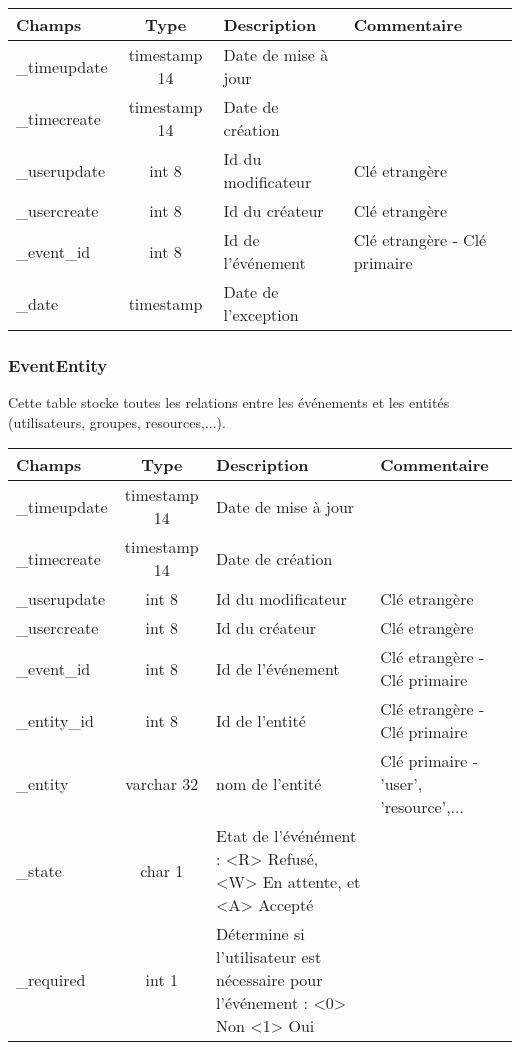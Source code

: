 \begin{tabular}{|p{3cm}|c|p{5.4cm}|p{2.6cm}|}
\hline
\textbf{Champs} & \textbf{Type} & \textbf{Description} & \textbf{Commentaire} \\
\hline
\_timeupdate & timestamp 14 & Date de mise à jour & \\
\hline
\_timecreate & timestamp 14 & Date de création & \\
\hline
\_userupdate & int 8 & Id du modificateur & Clé etrangère\\
\hline
\_usercreate & int 8 & Id du créateur & Clé etrangère\\
\hline
\_event\_id & int 8 & Id de l'événement & Clé etrangère - Clé primaire \\
\hline
\_date & timestamp & Date de l'exception & \\
\hline
\end{tabular}


\subsubsection{EventEntity}

Cette table stocke toutes les relations entre les événements et les entités (utilisateurs, groupes, resources,...).\\


\begin{tabular}{|p{3cm}|c|p{5.4cm}|p{2.6cm}|}
\hline
\textbf{Champs} & \textbf{Type} & \textbf{Description} & \textbf{Commentaire} \\
\hline
\_timeupdate & timestamp 14 & Date de mise à jour & \\
\hline
\_timecreate & timestamp 14 & Date de création & \\
\hline
\_userupdate & int 8 & Id du modificateur & Clé etrangère\\
\hline
\_usercreate & int 8 & Id du créateur & Clé etrangère\\
\hline
\_event\_id & int 8 & Id de l'événement & Clé etrangère - Clé primaire \\
\hline
\_entity\_id & int 8 & Id de l'entité & Clé etrangère - Clé primaire \\
\hline
\_entity & varchar 32 & nom de l'entité & Clé primaire - 'user', 'resource',... \\
\hline
\_state & char 1 & Etat de l'événément : <R> Refusé, <W> En attente, et <A> 
Accepté  & \\
\hline 
\_required & int 1 & Détermine si l'utilisateur est nécessaire pour l'événement
: <0> Non <1> Oui & \\
\hline
\end{tabular}


